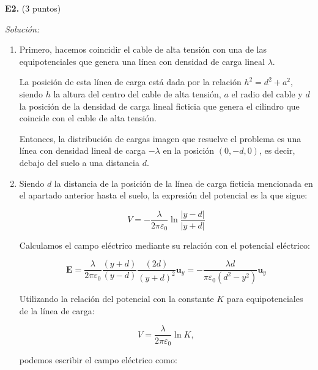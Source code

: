 \textbf{E2.} (3 puntos)


\vspace{20px}
\textit{Solución:}
\\

\begin{enumerate}
[label=\alph*)]
    \item Primero, hacemos coincidir el cable de alta tensión con una de las equipotenciales que genera una línea con densidad de carga
    lineal $\lambda$.

    La posición de esta línea de carga está dada por la relación $h^2 = d^2 + a^2$, siendo $h$ la altura del centro del cable de alta tensión, $a$ el radio del
    cable y $d$ la posición de la densidad de carga lineal ficticia que genera el cilindro que coincide con el cable de alta tensión.

    Entonces, la distribución de cargas imagen que resuelve el problema es una línea con densidad lineal de carga $-\lambda$ en la posición $(0, -d, 0)$, es
    decir, debajo del suelo a una distancia $d$.

    \vspace{20px}

    \item Siendo $d$ la distancia de la posición de la línea de carga ficticia mencionada en el apartado anterior hasta el suelo, la expresión del potencial es
    la que sigue:

    \begin{equation*}
        V = - \frac{\lambda}{2\pi\varepsilon_0} \ln{\frac{|y - d|}{|y+d|}}
    \end{equation*}

    Calculamos el campo eléctrico mediante su relación con el potencial eléctrico:

    \begin{equation*}
        \textbf{E} = \frac{\lambda}{2\pi\varepsilon_0} \frac{(y+d)}{(y-d)} \frac{(2d)}{(y+d)^2} \textbf{u}_y
        = - \frac{\lambda d}{\pi \varepsilon_0 (d^2 - y^2)}  \textbf{u}_y
    \end{equation*}

    Utilizando la relación del potencial con la constante $K$ para equipotenciales de la línea de carga:

    \begin{equation*}
        V = \frac{\lambda}{2\pi\varepsilon_0} \ln{K},
    \end{equation*}

    podemos escribir el campo eléctrico como:


\end{enumerate}
